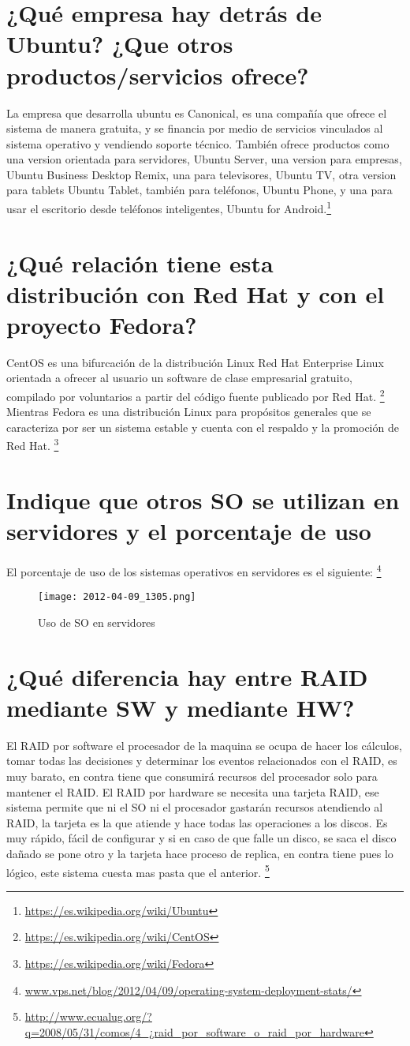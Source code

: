 \section{¿Qué empresa hay detrás de Ubuntu? ¿Que otros productos/servicios ofrece?}
La empresa que desarrolla ubuntu es Canonical, es una compañía que ofrece el sistema de manera gratuita, y se financia por medio de servicios vinculados al sistema operativo y vendiendo soporte técnico.
También ofrece productos como una version orientada para servidores, Ubuntu Server, una version para empresas, Ubuntu Business Desktop Remix, una para televisores, Ubuntu TV, otra version para tablets Ubuntu Tablet, también para teléfonos, Ubuntu Phone, y una para usar el escritorio desde teléfonos inteligentes, Ubuntu for Android.\footnote{\url{https://es.wikipedia.org/wiki/Ubuntu}}
\section{¿Qué relación tiene esta distribución con Red Hat y con el proyecto Fedora?}
CentOS es una bifurcación de la distribución Linux Red Hat Enterprise Linux orientada a ofrecer al usuario un software de clase empresarial gratuito, compilado por voluntarios a partir del código fuente publicado por Red Hat. \footnote{\url{https://es.wikipedia.org/wiki/CentOS}}
Mientras Fedora es una distribución Linux para propósitos generales que se caracteriza por ser un sistema estable y cuenta con el respaldo y la promoción de Red Hat.
\footnote{\url{https://es.wikipedia.org/wiki/Fedora}}
\section{Indique que otros SO se utilizan en servidores y el porcentaje de uso}
El porcentaje de uso de los sistemas operativos en servidores es el siguiente: \footnote{\url{www.vps.net/blog/2012/04/09/operating-system-deployment-stats/}}

\begin{figure}[H] 
\centering
\texttt{[image: 2012-04-09\_1305.png]}  
\label{figura1:}
\caption{Uso de SO en servidores}
\end{figure}
\newpage
\section{¿Qué diferencia hay entre RAID mediante SW y mediante HW?}
El RAID por software el procesador de la maquina se ocupa de hacer los cálculos, tomar todas las decisiones y determinar los eventos relacionados con el RAID, es muy barato, en contra tiene que consumirá recursos del procesador solo para mantener el RAID.
El RAID por hardware se necesita una tarjeta RAID, ese sistema permite que ni el SO ni el procesador gastarán recursos atendiendo al RAID, la tarjeta es la que atiende y hace todas las operaciones a los discos. Es muy rápido, fácil de configurar y si en caso de que falle un disco, se saca el disco dañado se pone otro y la tarjeta hace proceso de replica, en contra tiene pues lo lógico, este sistema cuesta mas pasta que el anterior.
\footnote{\url{http://www.ecualug.org/?q=2008/05/31/comos/4_¿raid_por_software_o_raid_por_hardware}}

